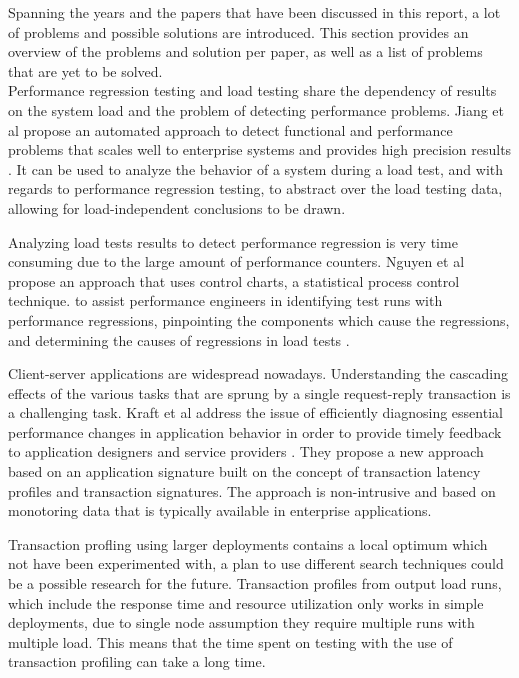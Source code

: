Spanning the years and the papers that have been discussed in this report, a lot of problems and possible solutions are introduced. This section provides an overview of the problems and solution per paper, as well as a list of problems that are yet to be solved.\\

Performance regression testing and load testing share the dependency of results on the system load and the problem of detecting performance problems. Jiang et al propose an automated approach to detect functional and performance problems that scales well to enterprise systems and provides high precision results \cite{jiang2010automated}. It can be used to analyze the behavior of a system during a load test, and with regards to performance regression testing, to abstract over the load testing data, allowing for load-independent conclusions to be drawn.

Analyzing load tests results to detect performance regression is
very time consuming due to the large amount of performance
counters. Nguyen et al propose an approach that uses control charts, a statistical process control technique. to assist performance engineers in identifying test runs with performance regressions, pinpointing the components which cause the regressions, and determining the causes of regressions in load tests \cite{nguyen2012using}.

Client-server applications are widespread nowadays. Understanding the cascading effects of the various tasks that are sprung by a single request-reply transaction is a challenging task. Kraft et al address the issue of efficiently diagnosing essential performance changes in application behavior in order to provide timely feedback to  application designers and service providers \cite{kraft2009estimating}. They propose a new approach based on an application signature built on the concept of transaction latency profiles and transaction signatures. The approach is non-intrusive and based on monotoring data that is typically available in enterprise applications.

Transaction profling using larger deployments contains a local optimum which not have been experimented with, a plan to use different search techniques could be a possible research for the future. \cite{ghaith2013} Transaction profiles from output load runs, which include the response time and resource utilization only works in simple deployments, due to single node assumption they require multiple runs with multiple load. This means that the time spent on testing with the use of transaction profiling can take a long time. 


